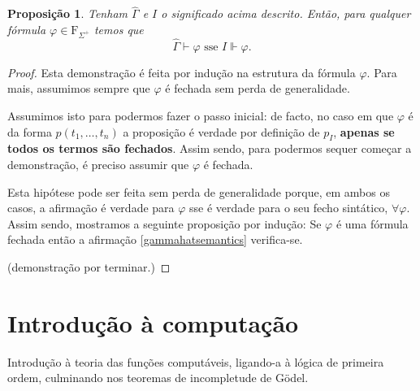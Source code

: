 \documentclass{report}
\newtheorem{prop}{Proposição}
\theoremstyle{definition}
\theoremstyle{remark}
\newcommand{\F}{\mathrm{F}}
\begin{document}
	\begin{prop}
	Tenham $\widehat\Gamma$ e $I$ o significado acima descrito. Então, para qualquer fórmula $\varphi \in \F_{\Sigma^+}$ temos que
	\begin{equation}\label{gammahatsemantics}
	\widehat\Gamma \vdash \varphi \text{ sse } I \Vdash \varphi.
	\end{equation}
	\end{prop}
	
	\begin{proof}
	Esta demonstração é feita por indução na estrutura da fórmula $\varphi$. Para mais, assumimos sempre que $\varphi$ é fechada sem perda de generalidade.
	
	Assumimos isto para podermos fazer o passo inicial: de facto, no caso em que $\varphi$ é da forma $p(t_1, \dots, t_n)$ a proposição é verdade por definição de $p_I$, \textbf{apenas se todos os termos são fechados}. Assim sendo, para podermos sequer começar a demonstração, é preciso assumir que $\varphi$ é fechada.
	
	Esta hipótese pode ser feita sem perda de generalidade porque, em ambos os casos, a afirmação é verdade para $\varphi$ sse é verdade para o seu fecho sintático, $\forall \varphi$. Assim sendo, mostramos a seguinte proposição por indução: Se $\varphi$ é uma fórmula fechada então a afirmação \eqref{gammahatsemantics} verifica-se.
	
	(demonstração por terminar.)
	\end{proof}
	
	
	\chapter{Introdução à computação}
	
	Introdução à teoria das funções computáveis, ligando-a à lógica de primeira ordem, culminando nos teoremas de incompletude de Gödel.
	
	
	\nocite{fltc}
	\nocite{shoenfield}
	
	
	
\end{document}
